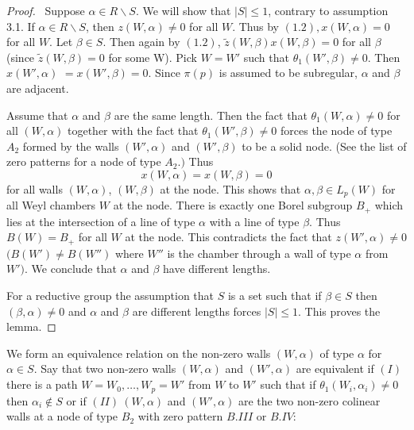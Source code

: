 \documentclass{memo-l}
\theoremstyle{definition}
\theoremstyle{remark}
\numberwithin{section}{chapter}
\numberwithin{equation}{chapter}
\begin{document}
\begin{proof} \ Suppose ${\alpha} \in R\backslash S$.  We will show
that $\vert S\vert \le 1$, contrary to assumption 3.1.  If ${\alpha}
\in R\backslash S$, then $z(W,{\alpha})\ne 0$ for all $W$.  Thus by
$(1.2), x(W,{\alpha}) = 0$ for all $W$.  Let ${\beta}  \in  S$.  Then again
by $(1.2)$, $\tilde z (W,{\beta})x(W,{\beta}) = 0$ for all ${\beta}$ (since
$\tilde z (W,{\beta}) = 0$ for some W).  Pick $W = W'$ such that
${\theta}_{1}(W',{\beta})\ne 0$.  Then $x(W',{\alpha})$ $= x(W',{\beta}) =
0$.  Since ${\pi}(p)$ is assumed to be subregular, ${\alpha}$ and ${\beta}$
are adjacent.

   Assume that ${\alpha}$ and ${\beta}$ are the same length.  Then the fact
that ${\theta}_{1}(W,{\alpha})\ne 0$ for all $(W,{\alpha})$ together with
the fact that ${\theta}_{1}(W',{\beta})\ne 0$ forces the node of type
$A_{2}$ formed by the walls $(W',{\alpha})$ and $(W',{\beta})$ to be a
solid node.  (See the list of zero patterns for a node of type $A_{2}.)$
Thus $$x(W,{\alpha}) = x(W,{\beta}) = 0$$ for all walls $(W,{\alpha})$,
$(W,{\beta})$ at the node.  This shows that ${\alpha}, {\beta}  \in 
L_{p}(W)$ for all Weyl chambers $W$ at the node.  There is exactly one
Borel subgroup $B_{+}$ which lies at the intersection of a line of type
${\alpha}$ with a line of type ${\beta}$.  Thus $B(W) = B_{+}$ for all $W$
at the node.  This contradicts the fact that $z(W',{\alpha})\ne 0$ 
$(B(W')\ne
B(W'')$ where $W''$ is the chamber through a wall of type ${\alpha}$ from
$W')$.  We conclude that ${\alpha}$ and ${\beta}$ have different lengths.

   For a reductive group the assumption that $S$ is a set such that if
${\beta}  \in  S$ then $({\beta},{\alpha})\ne 0$ and ${\alpha}$ and
${\beta}$ are different lengths forces $\vert S\vert \le 1$.  This
proves the lemma.      
\end{proof} 

{\medskip}


   We form an equivalence relation on the non-zero walls $(W,{\alpha})$ of
type ${\alpha}$ for ${\alpha}  \in  S$.  Say that two non-zero walls
$(W,{\alpha})$ and $(W',{\alpha})$ are equivalent if $(I)$ there is a path
$W = W_{0},\ldots ,W_{p} = W'$ from $W$ to $W'$ such that if
${\theta}_{1}(W_{i},{\alpha}_{i})\ne 0$ then ${\alpha}_{i} {\notin} S$ or
if $(II) \ (W,{\alpha})$ and $(W',{\alpha})$ are the two non-zero colinear
walls at a node of type $B_{2}$ with zero pattern $B.III$ or $B.IV$:
\medskip
\medskip
\end{document}
